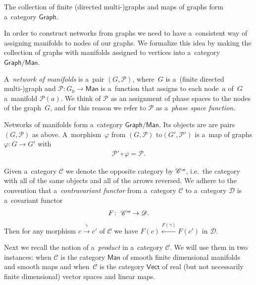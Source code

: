 \documentclass[pdftex]{sigma}
\numberwithin{equation}{section}
\newcommand{\op}[1]{{#1}^{\mbox{\sf{\tiny{op}}}}}
\begin{document}
\begin{Remark}
The collection of f\/inite (directed multi-)graphs and maps of graphs form a~category $\mathsf{Graph}$.
\end{Remark}

In order to construct networks from graphs we need to have a~consistent way of assigning manifolds to nodes of our
graphs.
We formalize this idea by making the collection of graphs with manifolds assigned to vertices into a~category
$\mathsf{Graph}/\mathsf{Man}$.

\begin{Definition}\label{def.network.mfld}
A~{\it network of manifolds} is a~pair $(G,{\mathcal P})$, where~$G$
is a~(f\/inite directed multi-)graph and ${\mathcal P}\colon G_0 \to \mathsf{Man}$ is a~function that assigns to each node~$a$ of~$G$
a~manifold ${\mathcal P}(a)$.
We think of ${\mathcal P}$ as an assignment of phase spaces to the nodes of the graph~$G$, and for this reason we refer
to ${\mathcal P}$ as a~{\em phase space function.}

Networks of manifolds form a~category $\mathsf{Graph}/\mathsf{Man}$.
Its objects are are pairs $(G,{\mathcal P})$ as above.
A~morphism~$\varphi$ from $(G,{\mathcal P})$ to$(G',{\mathcal P}')$ is a~map of graphs $\varphi\colon G\to G'$ with
\begin{gather*}
{\mathcal P}'\circ \varphi = {\mathcal P}.
\end{gather*}
\end{Definition}

\begin{Notation}
Given a~category $\mathscr{C}$ we denote the opposite category by $\op{\mathscr{C}}$, i.e.~the category with all of the
same objects and all of the arrows reversed.
We adhere to the convention that a~{\em contravariant functor} from a~category $\mathscr{C}$ to a~category $\mathscr{D}$
is a~covariant functor
\begin{gather*}
F\colon \ \op{\mathscr{C}}\to \mathscr{D}.
\end{gather*}
Then for any morphism $c\xrightarrow{\gamma}c'$ of $\mathscr{C}$ we have $F(c)\xleftarrow{F(\gamma)}F(c')$ in
$\mathscr{D}$.
\end{Notation}

Next we recall the notion of a~{\em product} in a~category $\mathscr{C}$.
We will use them in two instances: when $\mathscr{C}$ is the category $\mathsf{Man}$ of smooth f\/inite dimensional
manifolds and smooth maps and when~$\mathscr{C}$ is the category $\mathsf{Vect}$ of real (but not necessarily f\/inite
dimensional) vector spaces and linear maps.
\end{document}
